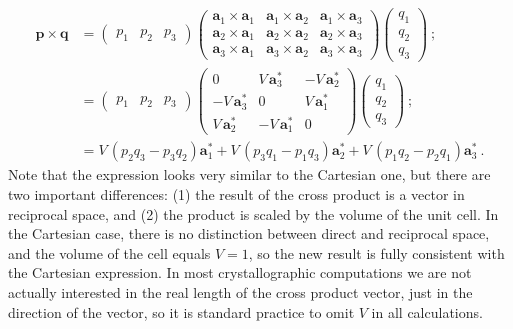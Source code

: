 \begin{equation}
\begin{split}
\mathbf{p}\times\mathbf{q} &= \begin{pmatrix}p_1&p_2&p_3\end{pmatrix}\begin{pmatrix}	
	\mathbf{a}_1\times\mathbf{a}_1 & \mathbf{a}_1\times\mathbf{a}_2 & \mathbf{a}_1\times\mathbf{a}_3 \\
	\mathbf{a}_2\times\mathbf{a}_1 & \mathbf{a}_2\times\mathbf{a}_2 & \mathbf{a}_2\times\mathbf{a}_3 \\
	\mathbf{a}_3\times\mathbf{a}_1 & \mathbf{a}_3\times\mathbf{a}_2 & \mathbf{a}_3\times\mathbf{a}_3\end{pmatrix}
	\begin{pmatrix}q_1\\ q_2\\ q_3\end{pmatrix}\ ; \\
	&=\begin{pmatrix}p_1&p_2&p_3\end{pmatrix}\begin{pmatrix}	
	0 & V\,\mathbf{a}^{\ast}_3 & -V\,\mathbf{a}^{\ast}_2 \\
	-V\,\mathbf{a}^{\ast}_3 & 0 & V\,\mathbf{a}^{\ast}_1 \\
	V\,\mathbf{a}^{\ast}_2 & -V\,\mathbf{a}^{\ast}_1 &0\end{pmatrix}
	\begin{pmatrix}q_1\\ q_2\\ q_3\end{pmatrix}\ ;\\
	&=V\,(p_2q_3-p_3q_2)\mathbf{a}^{\ast}_1+V\,(p_3q_1-p_1q_3)\mathbf{a}^{\ast}_2+V\,(p_1q_2-p_2q_1)\mathbf{a}^{\ast}_3\ .\label{\chabbr:eq:Bravaiscp}
\end{split}
\end{equation}
Note that the expression looks very similar to the Cartesian one, but there are two important differences: (1) the result of the cross product is a vector in reciprocal space, and (2) the product is scaled by the volume of the unit cell.  In the Cartesian case, there is no distinction between direct and reciprocal space, and the volume of the cell equals $V=1$, so the new result is fully consistent with the Cartesian expression.  In most crystallographic computations we are not actually interested in the real length of the cross product vector, just in the direction of the vector, so it is standard practice to omit $V$ in all calculations.

